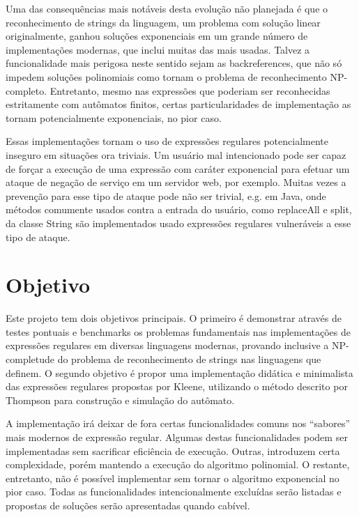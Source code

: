 \documentclass[a4paper,12pt,oneside,onecolumn]{uerj}
\begin{document}
Uma das consequências mais notáveis desta evolução não planejada é que o reconhecimento de strings da linguagem, um problema com solução linear originalmente, ganhou soluções exponenciais em um grande número de implementações modernas, que inclui muitas das mais usadas. Talvez a funcionalidade mais perigosa neste sentido sejam as backreferences, que não só impedem soluções polinomiais como tornam o problema de reconhecimento NP-completo. Entretanto, mesmo nas expressões que poderiam ser reconhecidas estritamente com autômatos finitos, certas particularidades de implementação as tornam potencialmente exponenciais, no pior caso.

Essas implementações tornam o uso de expressões regulares potencialmente inseguro em situações ora triviais. Um usuário mal intencionado pode ser capaz de forçar a execução de uma expressão com caráter exponencial para efetuar um ataque de negação de serviço em um servidor web, por exemplo. Muitas vezes a prevenção para esse tipo de ataque pode não ser trivial, e.g. em Java, onde métodos comumente usados contra a entrada do usuário, como replaceAll e split, da classe String são implementados usado expressões regulares vulneráveis a esse tipo de ataque.

\section{Objetivo}

Este projeto tem dois objetivos principais. O primeiro é demonstrar através de testes pontuais e benchmarks os problemas fundamentais nas implementações de expressões regulares em diversas linguagens modernas, provando inclusive a NP-completude do problema de reconhecimento de strings nas linguagens que definem. O segundo objetivo é propor uma implementação didática e minimalista das expressões regulares propostas por Kleene, utilizando o método descrito por Thompson para construção e simulação do autômato. 

A implementação irá deixar de fora certas funcionalidades comuns nos “sabores” mais modernos de expressão regular. Algumas destas funcionalidades podem ser implementadas sem sacrificar eficiência de execução. Outras, introduzem certa complexidade, porém mantendo a execução do algoritmo polinomial. O restante, entretanto, não é possível implementar sem tornar o algoritmo exponencial no pior caso. Todas as funcionalidades intencionalmente excluídas serão listadas e propostas de soluções serão apresentadas quando cabível.
\end{document}
